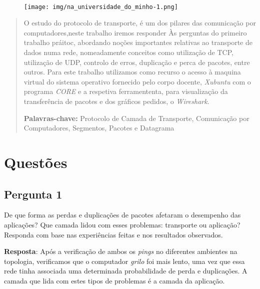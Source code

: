 \documentclass[runningheads]{llncs}
\begin{document}
\paragraph{}

\begin{figure}[ht]
\centering
\texttt{[image: img/na\_universidade\_do\_minho-1.png]} 
\end{figure} 

\setcounter{tocdepth}{2}
\makeatletter
\renewcommand*\l@author[2]{}
\renewcommand*\l@title[2]{}
\makeatletter
        
\newpage
\renewcommand{\contentsname}{Índice}
\tableofcontents
\printindex

\pagebreak

%
\renewcommand{\abstractname}{\textbf{Resumo:}}
\renewcommand{\keywords}{\textbf{Palavras-chave: }}
\begin{abstract}
O estudo do protocolo de transporte, é um dos pilares das comunicação por computadores,neste trabalho iremos responder Às perguntas do primeiro trabalho práitoc, abordando noções importantes relativas ao transporte de dados numa rede, nomeadamente conceitos como utilização de TCP, utilização de UDP, controlo de erros, duplicação e perca de pacotes, entre outros.
Para este trabalho utilizamos como recurso o acesso à maquina virtual do sistema operativo fornecido pelo corpo docente, \textit{Xubuntu} com o programa \textit{CORE} e a respetiva ferramententa, para visualização da transferência de pacotes e dos gráficos pedidos, o \textit{Wireshark}.

\keywords{Protocolo de Camada de Transporte,  Comunicação por Computadores, Segmentos, Pacotes e Datagrama}
\end{abstract}

\pagebreak

\section{Questões}
    \subsection{Pergunta 1}
    De que forma as perdas e duplicações de pacotes afetaram o desempenho das aplicações? Que camada lidou com esses problemas: transporte ou aplicação? Responda com base nas experiências feitas e nos resultados observados.
    
    \bigskip
    
    \textbf{Resposta}: Após a verificação de ambos os \textit{pings} no diferentes ambientes na topologia, verificamos que o computador \textit{grilo} foi mais lento, uma vez que essa rede tinha associada uma determinada probabilidade de perda e duplicações. 
    A camada que lida com estes tipos de problemas é a camada da aplicação.
    
\end{document}
